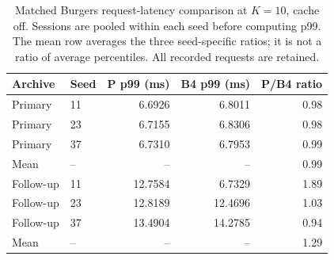 \begin{table}[ht]
\centering\small
\caption{Matched Burgers request-latency comparison at $K=10$, cache off. Sessions are pooled within each seed before computing p99. The mean row averages the three seed-specific ratios; it is not a ratio of average percentiles. All recorded requests are retained.}
\begin{tabular}{@{}llrrr@{}}\toprule
Archive & Seed & P p99 (ms) & B4 p99 (ms) & P/B4 ratio\\\midrule
Primary & 11 & 6.6926 & 6.8011 & 0.98\\
Primary & 23 & 6.7155 & 6.8306 & 0.98\\
Primary & 37 & 6.7310 & 6.7953 & 0.99\\
Mean & -- & -- & -- & 0.99\\
Follow-up & 11 & 12.7584 & 6.7329 & 1.89\\
Follow-up & 23 & 12.8189 & 12.4696 & 1.03\\
Follow-up & 37 & 13.4904 & 14.2785 & 0.94\\
Mean & -- & -- & -- & 1.29\\
\bottomrule\end{tabular}
\end{table}

